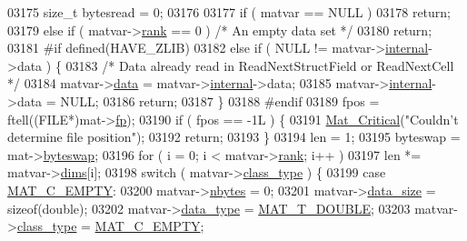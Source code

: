 \begin{DoxyCode}
{{{{{{{{{{{{{{{{03175     \textcolor{keywordtype}{size\_t} bytesread = 0;
03176 
03177     \textcolor{keywordflow}{if} ( matvar == NULL )
03178         \textcolor{keywordflow}{return};
03179     \textcolor{keywordflow}{else} \textcolor{keywordflow}{if} ( matvar->\hyperlink{group___m_a_t_a84ba70c96ded13cc555fa75b768d9921}{rank} == 0 )        \textcolor{comment}{/* An empty data set */}
03180         \textcolor{keywordflow}{return};
03181 \textcolor{preprocessor}{#if defined(HAVE\_ZLIB)}
03182     \textcolor{keywordflow}{else} \textcolor{keywordflow}{if} ( NULL != matvar->\hyperlink{group___m_a_t_a6e97e3ed9f40c49322c18561c2a94e92}{internal}->data ) \{
03183         \textcolor{comment}{/* Data already read in ReadNextStructField or ReadNextCell */}
03184         matvar->\hyperlink{group___m_a_t_a5672978efa230bbdecdf38ede781f7fa}{data} = matvar->\hyperlink{group___m_a_t_a6e97e3ed9f40c49322c18561c2a94e92}{internal}->data;
03185         matvar->\hyperlink{group___m_a_t_a6e97e3ed9f40c49322c18561c2a94e92}{internal}->data = NULL;
03186         \textcolor{keywordflow}{return};
03187     \}
03188 \textcolor{preprocessor}{#endif}
03189     fpos = ftell((FILE*)mat->\hyperlink{struct__mat__t_a85f562e407ca9ad4d2a6e14f839432b7}{fp});
03190     \textcolor{keywordflow}{if} ( fpos == -1L ) \{
03191         \hyperlink{group__mat__util_gaf51f2bfbb5580f575e4dd79757e2b80c}{Mat\_Critical}(\textcolor{stringliteral}{"Couldn't determine file position"});
03192         \textcolor{keywordflow}{return};
03193     \}
03194     len = 1;
03195     byteswap = mat->\hyperlink{struct__mat__t_a99d207977af5e04941ace56d71817a40}{byteswap};
03196     \textcolor{keywordflow}{for} ( i = 0; i < matvar->\hyperlink{group___m_a_t_a84ba70c96ded13cc555fa75b768d9921}{rank}; i++ )
03197         len *= matvar->\hyperlink{group___m_a_t_a8e01234e1c862ce3472bb37f5a09b92c}{dims}[i];
03198     switch ( matvar->\hyperlink{group___m_a_t_aff13035bf3265dd7d9425e5d40c839d4}{class\_type} ) \{
03199         \textcolor{keywordflow}{case} \hyperlink{group___m_a_t_ggad4d60ae7b709fc81bfd744fb4c857c40a5c76eef0ca0373d25abe49053be6fa9a}{MAT\_C\_EMPTY}:
03200             matvar->\hyperlink{group___m_a_t_abf1c844540503be2df9bb3db93cfe307}{nbytes} = 0;
03201             matvar->\hyperlink{group___m_a_t_a9ad1c82e2b568da617e12dc73a26e1f9}{data\_size} = \textcolor{keyword}{sizeof}(double);
03202             matvar->\hyperlink{group___m_a_t_ab6aafe9bd77f0f077852593dec438144}{data\_type} = \hyperlink{group___m_a_t_ggacf7b3b879282b7ab3a51190e49bf3453a31e721ecf7e188196f83c32838288797}{MAT\_T\_DOUBLE};
03203             matvar->\hyperlink{group___m_a_t_aff13035bf3265dd7d9425e5d40c839d4}{class\_type} = \hyperlink{group___m_a_t_ggad4d60ae7b709fc81bfd744fb4c857c40a5c76eef0ca0373d25abe49053be6fa9a}{MAT\_C\_EMPTY};
}}}}}}}}}}}}}}}}
\end{DoxyCode}
